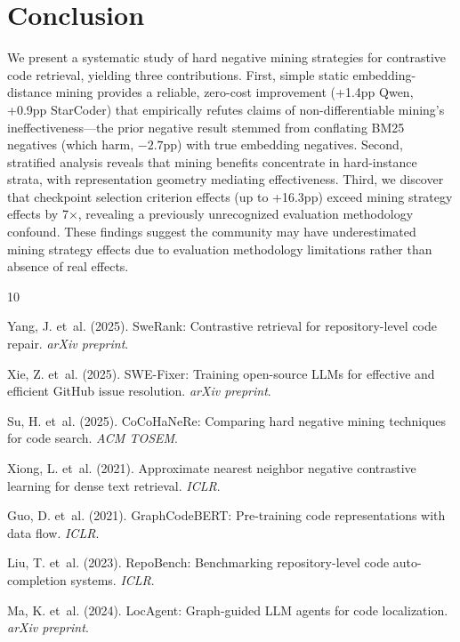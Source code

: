 \documentclass[11pt,a4paper]{article}
\begin{document}
\section{Conclusion}

We present a systematic study of hard negative mining strategies for contrastive code retrieval, yielding three contributions. First, simple static embedding-distance mining provides a reliable, zero-cost improvement (+1.4pp Qwen, +0.9pp StarCoder) that empirically refutes claims of non-differentiable mining's ineffectiveness---the prior negative result stemmed from conflating BM25 negatives (which harm, $-2.7$pp) with true embedding negatives. Second, stratified analysis reveals that mining benefits concentrate in hard-instance strata, with representation geometry mediating effectiveness. Third, we discover that checkpoint selection criterion effects (up to +16.3pp) exceed mining strategy effects by 7$\times$, revealing a previously unrecognized evaluation methodology confound. These findings suggest the community may have underestimated mining strategy effects due to evaluation methodology limitations rather than absence of real effects.


\begin{thebibliography}{10}

Yang, J. et~al. (2025).
\newblock SweRank: Contrastive retrieval for repository-level code repair.
\newblock \emph{arXiv preprint}.

Xie, Z. et~al. (2025).
\newblock SWE-Fixer: Training open-source LLMs for effective and efficient GitHub issue resolution.
\newblock \emph{arXiv preprint}.

Su, H. et~al. (2025).
\newblock CoCoHaNeRe: Comparing hard negative mining techniques for code search.
\newblock \emph{ACM TOSEM}.

Xiong, L. et~al. (2021).
\newblock Approximate nearest neighbor negative contrastive learning for dense text retrieval.
\newblock \emph{ICLR}.

Guo, D. et~al. (2021).
\newblock GraphCodeBERT: Pre-training code representations with data flow.
\newblock \emph{ICLR}.

Liu, T. et~al. (2023).
\newblock RepoBench: Benchmarking repository-level code auto-completion systems.
\newblock \emph{ICLR}.

Ma, K. et~al. (2024).
\newblock LocAgent: Graph-guided LLM agents for code localization.
\newblock \emph{arXiv preprint}.

\end{thebibliography}
\end{document}
